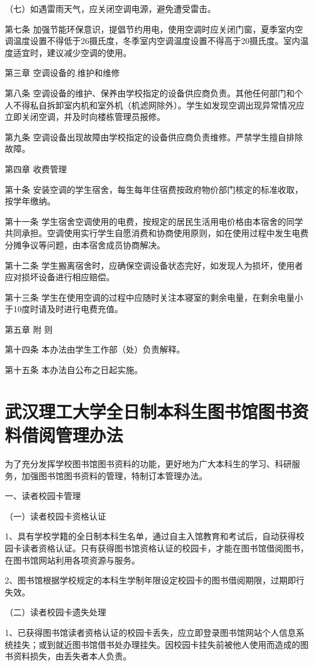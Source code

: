 \documentclass[UTF8,12pt,a4paper]{report}
\begin{document}
（七）如遇雷雨天气，应关闭空调电源，避免遭受雷击。

第七条 加强节能环保意识，提倡节约用电，使用空调时应关闭门窗，夏季室内空调温度设置不得低于26摄氏度，冬季室内空调温度设置不得高于20摄氏度。室内温度适宜时，建议减少空调的使用。

第三章 空调设备的.维护和维修

第八条 空调设备的维护、保养由学校指定的设备供应商负责。其他任何部门和个人不得私自拆卸室内机和室外机（机滤网除外）。学生如发现空调出现异常情况应立即关闭空调，并及时向楼栋管理员报修。

第九条 空调设备出现故障由学校指定的设备供应商负责维修。严禁学生擅自排除故障。

第四章 收费管理

第十条 安装空调的学生宿舍，每生每年住宿费按政府物价部门核定的标准收取，按学年缴纳。

第十一条 学生宿舍空调使用的电费，按规定的居民生活用电价格由本宿舍的同学共同承担。空调使用实行学生自愿消费和协商使用原则，如在使用过程中发生电费分摊争议等问题，由本宿舍成员协商解决。

第十二条 学生搬离宿舍时，应确保空调设备状态完好，如发现人为损坏，使用者应对损坏设备进行相应赔偿。

第十三条 学生在使用空调的过程中应随时关注本寝室的剩余电量，在剩余电量小于10度时请及时进行电费充值。

第五章 附 则

第十四条 本办法由学生工作部（处）负责解释。

第十五条 本办法自公布之日起实施。

\chapter{武汉理工大学全日制本科生图书馆图书资料借阅管理办法}
为了充分发挥学校图书馆图书资料的功能，更好地为广大本科生的学习、科研服务，加强图书馆图书资料的管理，特制订本管理办法。

一、读者校园卡管理

（一）读者校园卡资格认证

1、具有学校学籍的全日制本科生名单，通过自主入馆教育和考试后，自动获得校园卡读者资格认证。只有获得图书馆资格认证的校园卡，才能在图书馆借阅图书，在图书馆网站利用各项资源与服务。

2、图书馆根据学校规定的本科生学制年限设定校园卡的图书借阅期限，过期即行失效。

（二）读者校园卡遗失处理

1、已获得图书馆读者资格认证的校园卡丢失，应立即登录图书馆网站个人信息系统挂失；或到就近图书馆借书处办理挂失。因校园卡挂失前被他人使用而造成的图书资料损失，由丢失者本人负责。
\end{document}
